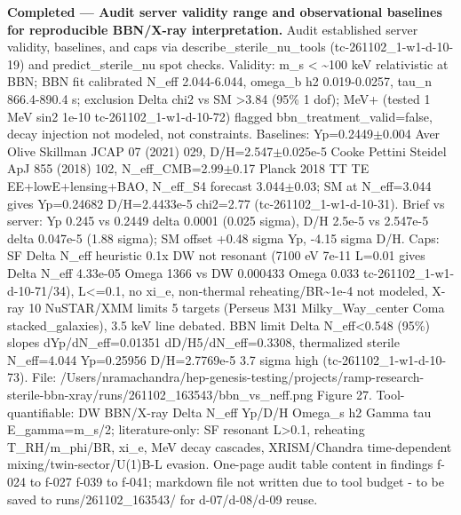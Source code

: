 \documentclass[11pt,a4paper]{article}
\begin{document}
\textbf{Completed --- Audit server validity range and observational baselines for reproducible BBN/X-ray interpretation.} Audit established server validity, baselines, and caps via describe\_sterile\_nu\_tools (tc-261102\_1-w1-d-10-19) and predict\_sterile\_nu spot checks. Validity: m\_s \textless{} \textasciitilde{}100 keV relativistic at BBN; BBN fit calibrated N\_eff 2.044-6.044, omega\_b h2 0.019-0.0257, tau\_n 866.4-890.4 s; exclusion Delta chi2 vs SM \textgreater{}3.84 (95\% 1 dof); MeV+ (tested 1 MeV sin2 1e-10 tc-261102\_1-w1-d-10-72) flagged bbn\_treatment\_valid=false, decay injection not modeled, not constraints. Baselines: Yp=0.2449$\pm$0.004 Aver Olive Skillman JCAP 07 (2021) 029, D/H=2.547$\pm$0.025e-5 Cooke Pettini Steidel ApJ 855 (2018) 102, N\_eff\_CMB=2.99$\pm$0.17 Planck 2018 TT TE EE+lowE+lensing+BAO, N\_eff\_S4 forecast 3.044$\pm$0.03; SM at N\_eff=3.044 gives Yp=0.24682 D/H=2.4433e-5 chi2=2.77 (tc-261102\_1-w1-d-10-31). Brief vs server: Yp 0.245 vs 0.2449 delta 0.0001 (0.025 sigma), D/H 2.5e-5 vs 2.547e-5 delta 0.047e-5 (1.88 sigma); SM offset +0.48 sigma Yp, -4.15 sigma D/H. Caps: SF Delta N\_eff heuristic 0.1x DW not resonant (7100 eV 7e-11 L=0.01 gives Delta N\_eff 4.33e-05 Omega 1366 vs DW 0.000433 Omega 0.033 tc-261102\_1-w1-d-10-71/34), L\textless{}=0.1, no xi\_e, non-thermal reheating/BR\textasciitilde{}1e-4 not modeled, X-ray 10 NuSTAR/XMM limits 5 targets (Perseus M31 Milky\_Way\_center Coma stacked\_galaxies), 3.5 keV line debated. BBN limit Delta N\_eff\textless{}0.548 (95\%) slopes dYp/dN\_eff=0.01351 dD/H5/dN\_eff=0.3308, thermalized sterile N\_eff=4.044 Yp=0.25956 D/H=2.7769e-5 3.7 sigma high (tc-261102\_1-w1-d-10-73). File: /Users/nramachandra/hep-genesis-testing/projects/ramp-research-sterile-bbn-xray/runs/261102\_163543/bbn\_vs\_neff.png Figure 27. Tool-quantifiable: DW BBN/X-ray Delta N\_eff Yp/D/H Omega\_s h2 Gamma tau E\_gamma=m\_s/2; literature-only: SF resonant L\textgreater{}0.1, reheating T\_RH/m\_phi/BR, xi\_e, MeV decay cascades, XRISM/Chandra time-dependent mixing/twin-sector/U(1)B-L evasion. One-page audit table content in findings f-024 to f-027 f-039 to f-041; markdown file not written due to tool budget - to be saved to runs/261102\_163543/ for d-07/d-08/d-09 reuse.
\end{document}
